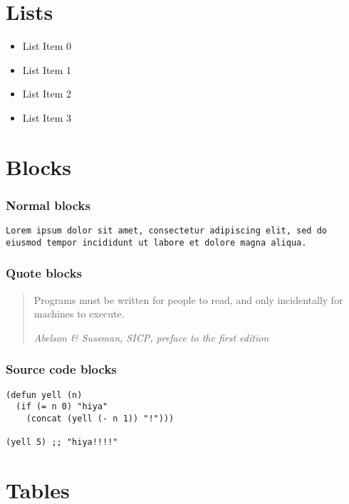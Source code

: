 \documentclass[UTF8,nofonts]{ctexart}
\begin{document}
\section{Lists}
\label{sec:orgheadline5}

\begin{itemize}
\item List Item 0
\item List Item 1
\item List Item 2
\item List Item 3
\end{itemize}

\section{Blocks}
\label{sec:orgheadline9}
\subsubsection{Normal blocks}
\label{sec:orgheadline6}

\begin{verbatim}
Lorem ipsum dolor sit amet, consectetur adipiscing elit, sed do
eiusmod tempor incididunt ut labore et dolore magna aliqua.
\end{verbatim}

\subsubsection{Quote blocks}
\label{sec:orgheadline7}

\begin{quote}
Programs must be written for people to read, and only incidentally
for machines to execute.

\emph{Abelson \& Sussman, SICP, preface to the first edition}
\end{quote}

\subsubsection{Source code blocks}
\label{sec:orgheadline8}

\begin{verbatim}
(defun yell (n)
  (if (= n 0) "hiya"
    (concat (yell (- n 1)) "!")))

(yell 5) ;; "hiya!!!!"
\end{verbatim}

\section{Tables}
\label{sec:orgheadline10}
\end{document}
